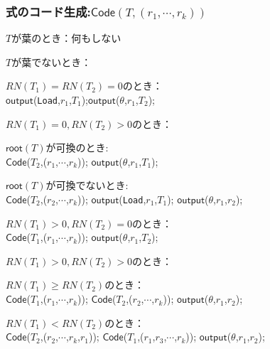 \documentclass[ckj,dvipdfmx]{beamer}
\begin{document}
\begin{frame}
  \frametitle{式のコード生成:$\mathsf{Code}(T,(r_1,\cdots,r_k))$}
  {\scriptsize
  \begin{list}{}{}
    \item $T$が葉のとき：何もしない
    \item $T$が葉でないとき：
    \begin{list}{}{}
      \item $RN(T_1)=RN(T_2)=0$のとき：\\
      \quad $\mathsf{output}$(\texttt{Load},$r_1$,$T_1$);$\mathsf{output}$($\theta$,$r_1$,$T_2$);
      \item $RN(T_1)=0,RN(T_2)>0$のとき：
      \begin{list}{}{}
        \item $\mathsf{root}(T)$が可換のとき:\\
        \quad $\mathsf{Code}$($T_2$,($r_1$,$\cdots$,$r_k$));
        $\mathsf{output}$($\theta$,$r_1$,$T_1$);
        \item $\mathsf{root}(T)$が可換でないとき:\\
        \quad $\mathsf{Code}$($T_2$,($r_2$,$\cdots$,$r_k$));
        $\mathsf{output}$(\texttt{Load},$r_1$,$T_1$);
        $\mathsf{output}$($\theta$,$r_1$,$r_2$);
      \end{list}
      \item $RN(T_1)>0,RN(T_2)=0$のとき：\\
      \quad $\mathsf{Code}$($T_1$,($r_1$,$\cdots$,$r_k$));
      $\mathsf{output}$($\theta$,$r_1$,$T_2$);
      \item $RN(T_1)>0,RN(T_2)>0$のとき：
      \begin{list}{}{}
        \item $RN(T_1)\geq RN(T_2)$のとき：\\
        \quad $\mathsf{Code}$($T_1$,($r_1$,$\cdots$,$r_k$));
        $\mathsf{Code}$($T_2$,($r_2$,$\cdots$,$r_k$));
        $\mathsf{output}$($\theta$,$r_1$,$r_2$);
        \item $RN(T_1)<RN(T_2)$のとき：\\
        \quad $\mathsf{Code}$($T_2$,($r_2$,$\cdots$,$r_k$,$r_1$));
        $\mathsf{Code}$($T_1$,($r_1$,$r_3$,$\cdots$,$r_k$));
        $\mathsf{output}$($\theta$,$r_1$,$r_2$);
      \end{list}
    \end{list}
  \end{list}
  }
\end{frame}
\end{document}
